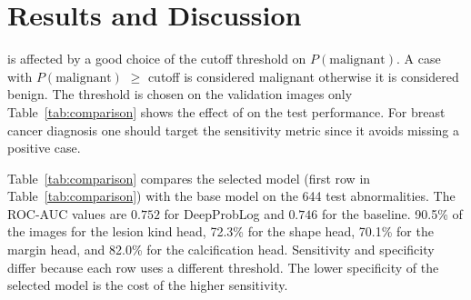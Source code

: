 \section{Results and Discussion}
\label{sec:results}
 is affected by a good choice of the cutoff threshold on $P(\mathrm{malignant})$. A case with $P(\mathrm{malignant})$ $\geq$ cutoff is considered malignant otherwise it is considered benign. The threshold is chosen on the validation images only  Table~\ref{tab:comparison} shows the effect of  on the test performance. For breast cancer diagnosis one should target the sensitivity metric since it avoids missing a positive case.



Table~\ref{tab:comparison} compares the selected model (first row in Table~\ref{tab:comparison}) with the base model on the 644 test abnormalities. The ROC-AUC values are $0.752$ for DeepProbLog and $0.746$ for the baseline.   90.5\% of the images for the lesion kind head, 72.3\% for the shape head, 70.1\% for the margin head, and 82.0\% for the calcification head. Sensitivity and specificity differ because each row uses a different threshold. The lower specificity of the selected model is the cost of the higher sensitivity.

